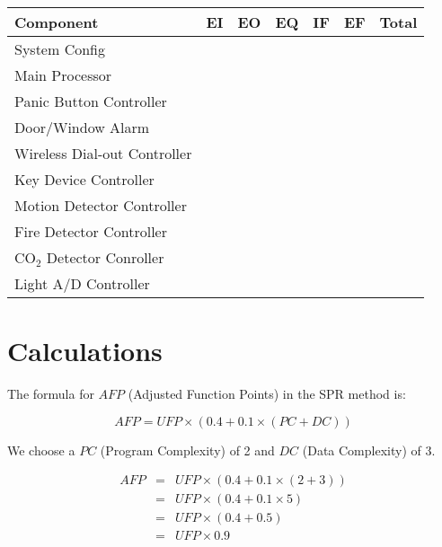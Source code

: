 \documentclass[11pt]{article}
\begin{document}
\begin{center}
  \begin{tabular}[h]{lllllll}
    {\bf Component}              & {\bf EI} & {\bf EO} & {\bf EQ} & {\bf IF} & {\bf EF} & {\bf Total} \\
    \hline \hline
    System Config                &          &          &          &          &          &             \\
    Main Processor               &          &          &          &          &          &             \\
    Panic Button Controller      &          &          &          &          &          &             \\
    Door/Window Alarm            &          &          &          &          &          &             \\
    Wireless Dial-out Controller &          &          &          &          &          &             \\
    Key Device Controller        &          &          &          &          &          &             \\
    Motion Detector Controller   &          &          &          &          &          &             \\
    Fire Detector Controller     &          &          &          &          &          &             \\
    CO$_2$ Detector Conroller    &          &          &          &          &          &             \\
    Light A/D Controller         &          &          &          &          &          & 
  \end{tabular}
\end{center}

\section{Calculations}

The formula for $AFP$ (Adjusted Function Points) in the SPR method is:

\begin{equation}
  AFP = UFP \times (0.4 + 0.1 \times (PC + DC))
\end{equation}

We choose a $PC$ (Program Complexity) of 2 and $DC$ (Data Complexity) of 3.

\begin{eqnarray}
  AFP & = & UFP \times (0.4 + 0.1 \times (2 + 3)) \\
      & = & UFP \times (0.4 + 0.1 \times 5) \\
      & = & UFP \times (0.4 + 0.5) \\
      & = & UFP \times 0.9 \\
\end{eqnarray}
\end{document}
